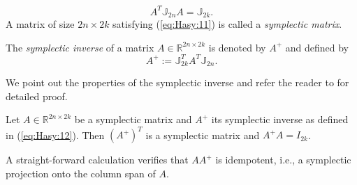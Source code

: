 \begin{equation} \label{eq:Hasy:11}
	A^T \mathbb{J}_{2n}A = \mathbb{J}_{2k}.
\end{equation}
A matrix of size $2n\times 2k$ satisfying (\ref{eq:Hasy:11}) is called a \emph{symplectic matrix}.

\begin{definition}
	The \emph{symplectic inverse} of a matrix $A\in \mathbb{R}^{2n\times 2k}$ is denoted by $A^+$ and defined by {\edit \cite{Peng:2014di}}
\begin{equation}\label{eq:Hasy:12}
	A^+ := \mathbb{J}_{2k}^T A^T \mathbb{J}_{2n}.
\end{equation}
\end{definition}
We point out the properties of the symplectic inverse and refer the reader to \cite{Peng:2014di} for detailed proof.
\begin{lemma} \label{lemma:Hasy:1}
Let $A\in \mathbb{R}^{2n\times 2k}$ be a symplectic matrix and $A^+$ its symplectic inverse as defined in (\ref{eq:Hasy:12}). Then ${(A^+)}^T$ is a symplectic matrix and $A^+A = I_{2k}$.
\end{lemma}

{\edit A straight-forward calculation verifies} that $AA^+$ is idempotent, i.e., a symplectic projection onto the column span of $A$.

